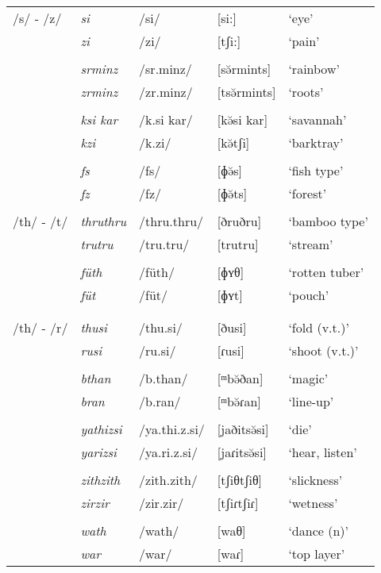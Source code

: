 \begin{longtable}{lllll}
		/s/ - /z/ & \emph{si} & /si/ & [si:] & `eye'\\
		& \emph{zi} & /zi/ & [tʃi:] & `pain'\\
		&&&&\\
		& \emph{srminz} & /sr.minz/ & [sə̆rmints] & `rainbow'\\
		& \emph{zrminz} & /zr.minz/ & [tsə̆rmints] & `roots'\\
		&&&&\\
		& \emph{ksi kar} & /k.si kar/ & [kə̆si kar] & `savannah'\\
		& \emph{kzi} & /k.zi/ & [kə̆tʃi] & `barktray'\\
		&&&&\\
		& \emph{fs} & /fs/ & [ɸə̆s] & `fish type'\\
		& \emph{fz} & /fz/ & [ɸə̆ts] & `forest'\\
		&&&&\\
		/th/ - /t/ & \emph{thruthru} & /thru.thru/ & [ðruðru] & `bamboo type'\\
		& \emph{trutru} & /tru.tru/ & [trutru] & `stream'\\
		&&&&\\
		& \emph{füth} & /füth/ & [ɸʏθ] & `rotten tuber'\\
		& \emph{füt} & /füt/ & [ɸʏt] & `pouch'\\
		&&&&\\
		&&&&\\
		/th/ - /r/ & \emph{thusi} & /thu.si/ & [ðusi] & `fold (v.t.)'\\
		& \emph{rusi} & /ru.si/ & [ɾusi] & `shoot (v.t.)'\\
		&&&&\\
		& \emph{bthan} & /b.than/ & [ᵐbə̆ðan] & `magic'\\
		& \emph{bran} & /b.ran/ & [ᵐbə̆ɾan] & `line-up'\\
		&&&&\\
		& \emph{yathizsi} & /ya.thi.z.si/ & [jaðitsə̆si] & `die'\\
		& \emph{yarizsi} & /ya.ri.z.si/ & [jaɾitsə̆si] & `hear, listen'\\
		&&&&\\
		& \emph{zithzith} & /zith.zith/ & [tʃiθtʃiθ]& `slickness'\\
		& \emph{zirzir} & /zir.zir/ & [tʃiɾtʃiɾ]& `wetness'\\
		&&&&\\
		& \emph{wath} & /wath/ & [waθ] & `dance (n)'\\
		& \emph{war} & /war/ & [waɾ] & `top layer'\\

\end{longtable}
